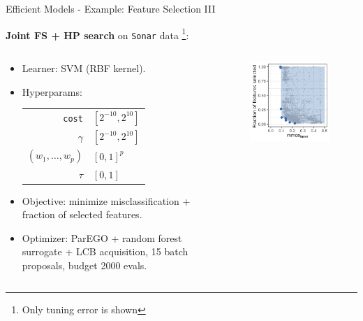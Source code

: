 \documentclass[11pt,compress,t,notes=noshow,xcolor=table]{beamer}
\begin{document}
\begin{vbframe}{Efficient Models - Example: Feature Selection III}

\textbf{Joint FS + HP search} on \texttt{Sonar} data%
\footnote{Only tuning error is shown}:

\begin{columns}
\begin{column}{0.65\textwidth}
\begin{itemize}
  \item Learner: SVM (RBF kernel).
  \item Hyperparams:
    \begin{tabular}{rl}
      \texttt{cost} & $[2^{-10},2^{10}]$ \\
      $\gamma$      & $[2^{-10},2^{10}]$ \\
      $(w_1,\dots,w_p)$ & $[0,1]^p$ \\
      $\tau$        & $[0,1]$
    \end{tabular}
  \item Objective: minimize misclassification + fraction of selected features.
  \item Optimizer: ParEGO + random forest surrogate + LCB acquisition, 15 batch proposals, budget 2000 evals.
\end{itemize}
\end{column}
\begin{column}{0.35\textwidth}
\begin{figure}
\includegraphics[width=\linewidth]{slides/11-multicrit/figure_man/mosmafs_sonar_eval_domHV.pdf}
\end{figure}
\end{column}
\end{columns}

\end{vbframe}
\end{document}
